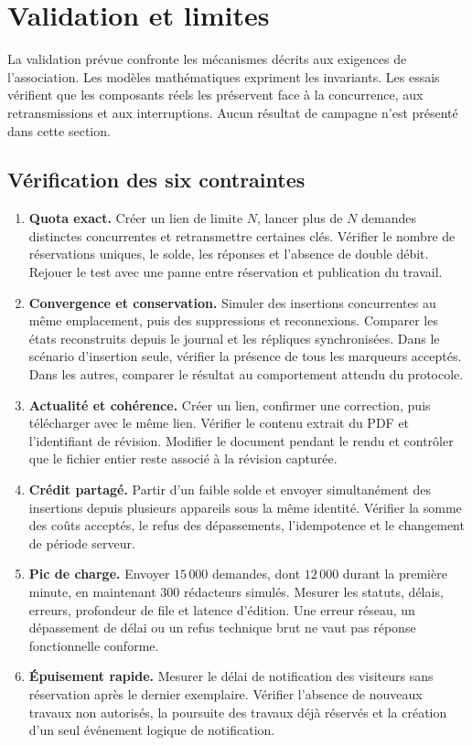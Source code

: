 \section{Validation et limites}

La validation prévue confronte les mécanismes décrits aux exigences de l'association. Les modèles mathématiques expriment les invariants. Les essais vérifient que les composants réels les préservent face à la concurrence, aux retransmissions et aux interruptions. Aucun résultat de campagne n'est présenté dans cette section.

\subsection{Vérification des six contraintes}
\begin{enumerate}
\item \textbf{Quota exact.} Créer un lien de limite $N$, lancer plus de $N$ demandes distinctes concurrentes et retransmettre certaines clés. Vérifier le nombre de réservations uniques, le solde, les réponses et l'absence de double débit. Rejouer le test avec une panne entre réservation et publication du travail.
\item \textbf{Convergence et conservation.} Simuler des insertions concurrentes au même emplacement, puis des suppressions et reconnexions. Comparer les états reconstruits depuis le journal et les répliques synchronisées. Dans le scénario d'insertion seule, vérifier la présence de tous les marqueurs acceptés. Dans les autres, comparer le résultat au comportement attendu du protocole.
\item \textbf{Actualité et cohérence.} Créer un lien, confirmer une correction, puis télécharger avec le même lien. Vérifier le contenu extrait du PDF et l'identifiant de révision. Modifier le document pendant le rendu et contrôler que le fichier entier reste associé à la révision capturée.
\item \textbf{Crédit partagé.} Partir d'un faible solde et envoyer simultanément des insertions depuis plusieurs appareils sous la même identité. Vérifier la somme des coûts acceptés, le refus des dépassements, l'idempotence et le changement de période serveur.
\item \textbf{Pic de charge.} Envoyer $15\,000$ demandes, dont $12\,000$ durant la première minute, en maintenant $300$ rédacteurs simulés. Mesurer les statuts, délais, erreurs, profondeur de file et latence d'édition. Une erreur réseau, un dépassement de délai ou un refus technique brut ne vaut pas réponse fonctionnelle conforme.
\item \textbf{Épuisement rapide.} Mesurer le délai de notification des visiteurs sans réservation après le dernier exemplaire. Vérifier l'absence de nouveaux travaux non autorisés, la poursuite des travaux déjà réservés et la création d'un seul événement logique de notification.
\end{enumerate}

